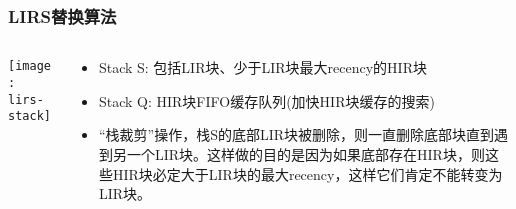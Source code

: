 \begin{frame}[plain]
	\frametitle{LIRS替换算法}
	\begin{columns}
		\begin{column}{.5\textwidth}
			\centering
			\texttt{[image: lirs-stack]}
			
		\end{column}
		
		\begin{column}{.5\textwidth}
			
			\begin{itemize}
				\item Stack S:  包括LIR块、少于LIR块最大recency的HIR块
				\item Stack Q:  HIR块FIFO缓存队列(加快HIR块缓存的搜索)

				\item “栈裁剪”操作，栈S的底部LIR块被删除，则一直删除底部块直到遇到另一个LIR块。这样做的目的是因为如果底部存在HIR块，则这些HIR块必定大于LIR块的最大recency，这样它们肯定不能转变为LIR块。
				
				
			\end{itemize}
			
		\end{column}
		
		
	\end{columns}
\end{frame}


